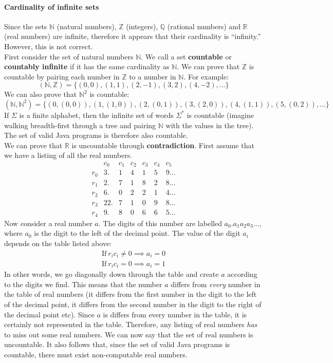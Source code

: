 \documentclass{article}
\begin{document}
\paragraph{Cardinality of infinite sets} Since the sets $\mathbb{N}$ (natural numbers), $\mathbb{Z}$ (integers), $\mathbb{Q}$ (rational numbers) and $\mathbb{R}$ (real numbers) are infinite, therefore it appears that their cardinality is ``infinity.'' However, this is not correct.
\vspace{1mm}\\
First consider the set of natural numbers $\mathbb{N}$. We call a set \textbf{countable} or \textbf{countably infinite} if it has the same cardinality as $\mathbb{N}$. We can prove that $\mathbb{Z}$ is countable by pairing each number in $\mathbb{Z}$ to a number in $\mathbb{N}$. For example:
$$(\mathbb{N,Z})=\{(0,0),(1,1),(2,-1),(3,2),(4,-2),...\}$$
We can also prove that $\mathbb{N}^2$ is countable:
$$(\mathbb{N,N}^2)=\{(0,(0,0)),(1,(1,0)),(2,(0,1)),(3,(2,0)),(4,(1,1)),(5,(0,2)),...\}$$
If $\Sigma$ is a finite alphabet, then the infinite set of words $\Sigma^*$ is countable (imagine walking breadth-first through a tree and pairing $\mathbb{N}$ with the values in the tree). The set of valid Java programs is therefore also countable.
\vspace{1mm}\\
We can prove that $\mathbb{R}$ is uncountable through \textbf{contradiction}. First assume that we have a listing of all the real numbers.
$$\begin{array}{l|c|ccccc}
  & c_0 & c_1 & c_2 & c_3 & c_4 & c_5\\
  \hline
  r_0 & 3. & 1 & 4 & 1 & 5 & 9...\\
  r_1 & 2. & 7 & 1 & 8 & 2 & 8...\\
  r_2 & 6. & 0 & 2 & 2 & 1 & 4...\\
  r_3 & 22. & 7 & 1 & 0 & 9 & 8...\\
  r_4 & 9. & 8 & 0 & 6 & 6 & 5...
\end{array}$$
Now consider a real number $a$. The digits of this number are labelled $a_0.a_1a_2a_3...$, where $a_0$ is the digit to the left of the decimal point. The value of the digit $a_i$ depends on the table listed above:
\begin{gather*}
  \text{If}\ r_ic_i\neq 0 \implies a_i=0\\
  \text{If}\ r_ic_i=0 \implies a_i=1
\end{gather*}
In other words, we go diagonally down through the table and create $a$ according to the digits we find. This means that the number $a$ differs from \textit{every} number in the table of real numbers (it differs from the first number in the digit to the left of the decimal point, it differs from the second number in the digit to the right of the decimal point etc). Since $a$ is differs from every number in the table, it is certainly not represented in the table. Therefore, any listing of real numbers \textit{has} to miss out some real numbers. We can now say that the set of real numbers is uncountable. It also follows that, since the set of valid Java programs is countable, there must exist non-computable real numbers.
\end{document}
